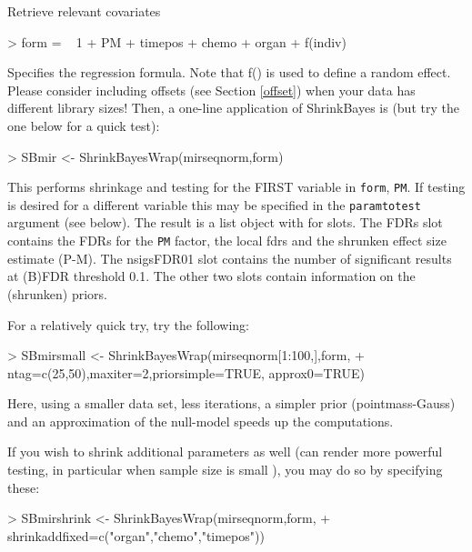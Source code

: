 \documentclass[11pt]{article}
\newcommand{\para}{\bigskip\noindent}
\begin{document}
\para
\begin{Schunk}
\end{Schunk}
Retrieve relevant covariates

\para
\begin{Schunk}
\begin{Sinput}
> form = ~ 1 + PM + timepos + chemo + organ + f(indiv)
\end{Sinput}
\end{Schunk}
Specifies the regression formula. Note that f() is used to define a random effect. Please consider
including offsets (see Section \ref{offset}) when your data has different library sizes!
Then, a one-line application of ShrinkBayes is (but try the one below for a quick test):
\para
\begin{Schunk}
\begin{Sinput}
> SBmir <- ShrinkBayesWrap(mirseqnorm,form)
\end{Sinput}
\end{Schunk}
This performs shrinkage and testing for the FIRST variable in \texttt{form}, \texttt{PM}. If testing is desired for a different
variable this may be specified in the \texttt{paramtotest} argument (see below). The result is a list object with for slots.
The FDRs slot contains the FDRs for the \texttt{PM} factor, the local fdrs and the shrunken effect size estimate (P-M). The nsigsFDR01 slot
contains the number of significant results at (B)FDR threshold 0.1. The other two slots contain information on the
(shrunken) priors.

\para
For a relatively quick try, try the following:
\begin{Schunk}
\begin{Sinput}
> SBmirsmall <- ShrinkBayesWrap(mirseqnorm[1:100,],form,
+ ntag=c(25,50),maxiter=2,priorsimple=TRUE, approx0=TRUE)
\end{Sinput}
\end{Schunk}
Here, using a smaller data set, less iterations, a simpler prior (pointmass-Gauss) and an approximation of the null-model speeds up the computations.


\para
If you wish to shrink additional parameters as well (can render more powerful testing, in particular when sample size is small \citep{WielHTRNAi}), you may do so
by specifying these:
\begin{Schunk}
\begin{Sinput}
> SBmirshrink <- ShrinkBayesWrap(mirseqnorm,form,
+ shrinkaddfixed=c("organ","chemo","timepos"))
\end{Sinput}
\end{Schunk}
\end{document}
